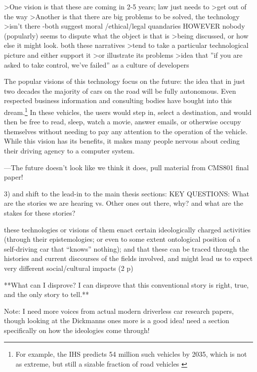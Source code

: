 >One vision is that these are coming in 2-5 years; law just needs to
>get out of the way
>Another is that there are big problems to be solved, the technology
>isn't there
-both suggest moral /ethical/legal quandaries
HOWEVER nobody (popularly) seems to dispute what the object is that is
>being discussed, or how else it might look. both these narratives
>tend to take a particular technological picture and either support it
>or illustrate its problems
>idea that ''if you are asked to take control, we've failed'' as a culture of developers

The popular visions of this technology focus on the future: the
idea that in just two decades the majority of cars on the road will be
fully autonomous. Even respected business information and consulting
bodies have bought into this dream.\footnote{For example, the IHS
  predicts 54 million such vehicles by 2035, which is not as extreme,
  but still a sizable fraction of road vehicles \cite{IHSstudy}} In these vehicles, the users would
step in, select a destination, and would then be free to read, sleep,
watch a movie, answer emails, or otherwise occupy themselves without
needing to pay any attention to the operation of the vehicle. While this
vision has its benefits, it makes many people nervous about
ceding their driving agency to a computer system.\cite{clytton}



---The future doesn't look like we think it does, pull material from
CMS801 final paper! 



3) and shift to the lead-in to the main thesis sections: 
KEY QUESTIONS: What are the stories we are hearing vs. Other ones out
there, why? and what are the stakes for these stories?

these technologies or visions of them enact certain ideologically charged
activities (through their epistemologies; or even to some extent
ontological position of a self-driving car that ``knows'' nothing);
and that these can be traced through the histories and current
discourses of the fields involved, and might lead us to expect very
different social/cultural impacts (2 p)

**What can I disprove?
I can disprove that this conventional story is right, true, and the
only story to tell.**

Note: I need more voices from actual modern driverless car research
papers, though looking at the Dickmanns ones more is a good idea! need
a section specifically on how the ideologies come through!

